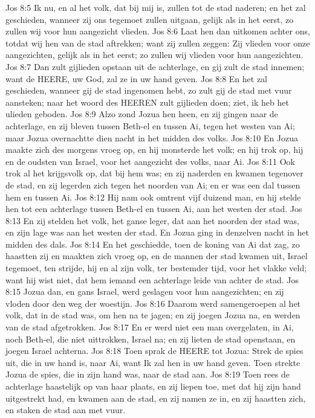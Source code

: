 Jos 8:5  Ik nu, en al het volk, dat bij mij is, zullen tot de stad naderen; en het zal geschieden, wanneer zij ons tegemoet zullen uitgaan, gelijk als in het eerst, zo zullen wij voor hun aangezicht vlieden.
Jos 8:6  Laat hen dan uitkomen achter ons, totdat wij hen van de stad aftrekken; want zij zullen zeggen: Zij vlieden voor onze aangezichten, gelijk als in het eerst; zo zullen wij vlieden voor hun aangezichten.
Jos 8:7  Dan zult gijlieden opstaan uit de achterlage, en gij zult de stad innemen; want de HEERE, uw God, zal ze in uw hand geven.
Jos 8:8  En het zal geschieden, wanneer gij de stad ingenomen hebt, zo zult gij de stad met vuur aansteken; naar het woord des HEEREN zult gijlieden doen; ziet, ik heb het ulieden geboden.
Jos 8:9  Alzo zond Jozua hen heen, en zij gingen naar de achterlage, en zij bleven tussen Beth-el en tussen Ai, tegen het westen van Ai; maar Jozua overnachtte dien nacht in het midden des volks.
Jos 8:10  En Jozua maakte zich des morgens vroeg op, en hij monsterde het volk; en hij trok op, hij en de oudsten van Israel, voor het aangezicht des volks, naar Ai.
Jos 8:11  Ook trok al het krijgsvolk op, dat bij hem was; en zij naderden en kwamen tegenover de stad, en zij legerden zich tegen het noorden van Ai; en er was een dal tussen hem en tussen Ai.
Jos 8:12  Hij nam ook omtrent vijf duizend man, en hij stelde hen tot een achterlage tussen Beth-el en tussen Ai, aan het westen der stad.
Jos 8:13  En zij stelden het volk, het ganse leger, dat aan het noorden der stad was, en zijn lage was aan het westen der stad. En Jozua ging in denzelven nacht in het midden des dals.
Jos 8:14  En het geschiedde, toen de koning van Ai dat zag, zo haastten zij en maakten zich vroeg op, en de mannen der stad kwamen uit, Israel tegemoet, ten strijde, hij en al zijn volk, ter bestemder tijd, voor het vlakke veld; want hij wist niet, dat hem iemand een achterlage leide van achter de stad.
Jos 8:15  Jozua dan, en gans Israel, werd geslagen voor hun aangezichten; en zij vloden door den weg der woestijn.
Jos 8:16  Daarom werd samengeroepen al het volk, dat in de stad was, om hen na te jagen; en zij joegen Jozua na, en werden van de stad afgetrokken.
Jos 8:17  En er werd niet een man overgelaten, in Ai, noch Beth-el, die niet uittrokken, Israel na; en zij lieten de stad openstaan, en joegen Israel achterna.
Jos 8:18  Toen sprak de HEERE tot Jozua: Strek de spies uit, die in uw hand is, naar Ai, want Ik zal hen in uw hand geven. Toen strekte Jozua de spies, die in zijn hand was, naar de stad aan.
Jos 8:19  Toen rees de achterlage haastelijk op van haar plaats, en zij liepen toe, met dat hij zijn hand uitgestrekt had, en kwamen aan de stad, en zij namen ze in, en zij haastten zich, en staken de stad aan met vuur.
